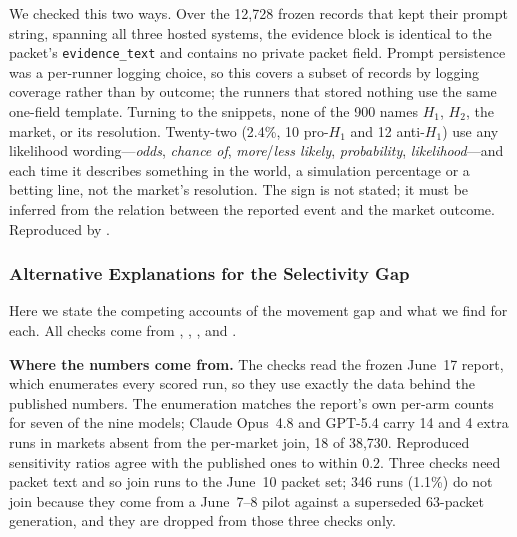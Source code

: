 We checked this two ways. Over the 12{,}728 frozen records that kept their prompt
string, spanning all three hosted systems, the evidence block is identical to the
packet's \texttt{evidence\_text} and contains no private packet field. Prompt
persistence was a per-runner logging choice, so this covers a subset of records by
logging coverage rather than by outcome; the runners that stored nothing use the
same one-field template. Turning to the snippets, none of the 900 names $H_1$,
$H_2$, the market, or its resolution. Twenty-two (2.4\%, 10 pro-$H_1$ and 12
anti-$H_1$) use any likelihood wording---\emph{odds}, \emph{chance of},
\emph{more}/\emph{less likely}, \emph{probability}, \emph{likelihood}---and each
time it describes something in the world, a simulation percentage or a betting
line, not the market's resolution. The sign is not stated; it must be inferred from the relation between the
reported event and the market outcome. Reproduced by
.

\subsubsection{Alternative Explanations for the Selectivity Gap}
\label{app:exp1-alternatives}
Here we state the competing accounts of the movement gap and what we find for each.
All checks come from ,
, , and
.

\textbf{Where the numbers come from.} The checks read the frozen June~17 report,
which enumerates every scored run, so they use exactly the data behind the
published numbers. The enumeration matches the report's own per-arm counts for
seven of the nine models; Claude Opus~4.8 and GPT-5.4 carry 14 and 4 extra runs in
markets absent from the per-market join, 18 of 38{,}730. Reproduced sensitivity
ratios agree with the published ones to within $0.2$. Three checks need packet
text and so join runs to the June~10 packet set; 346 runs (1.1\%) do not join
because they come from a June~7--8 pilot against a superseded 63-packet
generation, and they are dropped from those three checks only.

